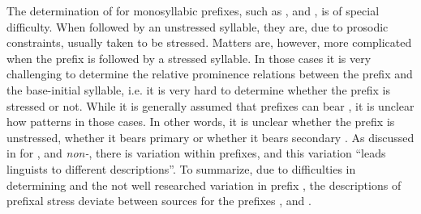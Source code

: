 The determination of  for monosyllabic prefixes, such as ,  and , is of special difficulty. When followed by an unstressed syllable, they are, due to prosodic constraints, usually taken to be stressed. Matters are, however, more complicated when the prefix is followed by a stressed syllable. In those cases it is very challenging to determine the relative prominence relations between the prefix and the base-initial syllable, i.e. it is very hard to determine whether the prefix is stressed or not. 
While it is generally assumed that prefixes can bear , it is unclear how  patterns in those cases. In other words, it is unclear whether the prefix is unstressed, whether it bears primary  or whether it bears secondary . As discussed in \citet[126]{Okada.2013} for ,  and \textit{non-}, there is variation within prefixes, and this variation ``leads linguists to different descriptions''. 
To summarize, due to difficulties in determining  and the not well researched variation in prefix , the descriptions of prefixal stress deviate between sources for the prefixes ,  and . %


